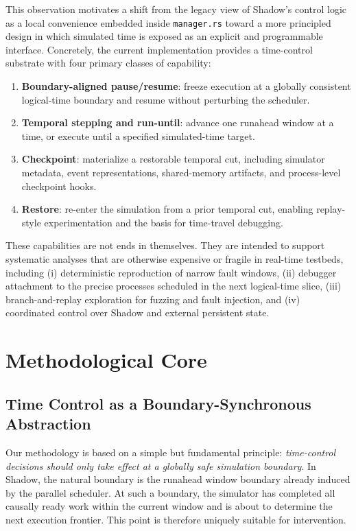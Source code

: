 \documentclass[11pt,a4paper]{article}
\begin{document}
This observation motivates a shift from the legacy view of Shadow's control
logic as a local convenience embedded inside \texttt{manager.rs} toward a
more principled design in which simulated time is exposed as an explicit and
programmable interface. Concretely, the current implementation provides a
time-control substrate with four primary classes of capability:

\begin{enumerate}[leftmargin=1.7em]
  \item \textbf{Boundary-aligned pause/resume}: freeze execution at a
  globally consistent logical-time boundary and resume without perturbing the
  scheduler.
  \item \textbf{Temporal stepping and run-until}: advance one runahead window
  at a time, or execute until a specified simulated-time target.
  \item \textbf{Checkpoint}: materialize a restorable temporal cut, including
  simulator metadata, event representations, shared-memory artifacts, and
  process-level checkpoint hooks.
  \item \textbf{Restore}: re-enter the simulation from a prior temporal cut,
  enabling replay-style experimentation and the basis for time-travel
  debugging.
\end{enumerate}

These capabilities are not ends in themselves. They are intended to support
systematic analyses that are otherwise expensive or fragile in real-time
testbeds, including (i) deterministic reproduction of narrow fault windows,
(ii) debugger attachment to the precise processes scheduled in the next
logical-time slice, (iii) branch-and-replay exploration for fuzzing and fault
injection, and (iv) coordinated control over Shadow and external persistent
state.

\section{Methodological Core}

\subsection{Time Control as a Boundary-Synchronous Abstraction}

Our methodology is based on a simple but fundamental principle:
\emph{time-control decisions should only take effect at a globally safe
simulation boundary}. In Shadow, the natural boundary is the runahead window
boundary already induced by the parallel scheduler. At such a boundary,
the simulator has completed all causally ready work within the current
window and is about to determine the next execution frontier. This point is
therefore uniquely suitable for intervention.
\end{document}
